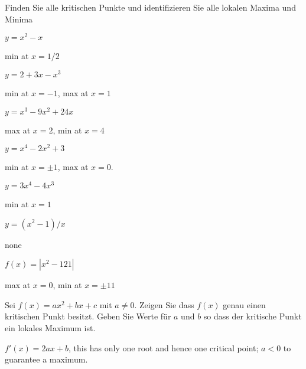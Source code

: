 \begin{exercises}
\noindent Finden Sie alle kritischen Punkte und identifizieren Sie alle lokalen Maxima und Minima

\twocol

\begin{exercise} $y=x^2-x$ 
\begin{answer} min at $x=1/2$
\end{answer}\end{exercise}

\begin{exercise} $y=2+3x-x^3$ 
\begin{answer} min at $x=-1$, max at $x=1$
\end{answer}\end{exercise}

\begin{exercise} $y=x^3-9x^2+24x$
\begin{answer} max at $x=2$, min at $x=4$
\end{answer}\end{exercise}

\begin{exercise} $y=x^4-2x^2+3$ 
\begin{answer} min at $x=\pm 1$, max at $x=0$.
\end{answer}\end{exercise}

\begin{exercise} $y=3x^4-4x^3$
\begin{answer} min at $x=1$
\end{answer}\end{exercise}

\begin{exercise} $y=(x^2-1)/x$
\begin{answer} none
\end{answer}\end{exercise}

\begin{exercise} $f(x) = |x^2 - 121|$
\begin{answer} max at $x=0$, min at $x=\pm 11$
\end{answer}\end{exercise}

\endtwocol

\begin{exercise} Sei $f(x) =a x^2 + bx + c$ mit $a\neq 0$. Zeigen Sie dass $f(x)$
genau einen kritischen Punkt besitzt. Geben Sie Werte für $a$ und $b$ so dass der kritische Punkt ein lokales Maximum ist.
\begin{answer} $f'(x) = 2ax + b$, this has only one root and hence one critical point; $a<0$ to guarantee a maximum.
\end{answer}
\end{exercise}
\end{exercises}











